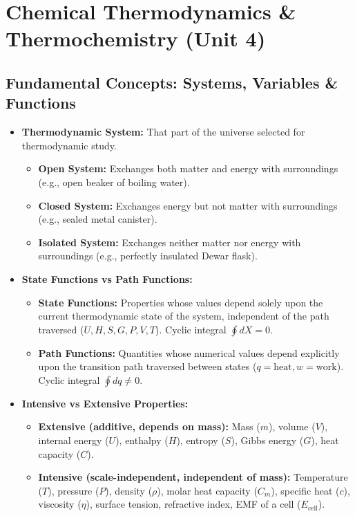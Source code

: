 \documentclass[10pt,a4paper]{article}
\begin{document}
\section{Chemical Thermodynamics \& Thermochemistry (Unit 4)}

\subsection{Fundamental Concepts: Systems, Variables \& Functions}
\begin{itemize}
  \item \textbf{Thermodynamic System:} That part of the universe selected for thermodynamic study.
  \begin{itemize}
    \item \textbf{Open System:} Exchanges both matter and energy with surroundings (e.g., open beaker of boiling water).
    \item \textbf{Closed System:} Exchanges energy but not matter with surroundings (e.g., sealed metal canister).
    \item \textbf{Isolated System:} Exchanges neither matter nor energy with surroundings (e.g., perfectly insulated Dewar flask).
  \end{itemize}
  \item \textbf{State Functions vs Path Functions:}
  \begin{itemize}
    \item \textbf{State Functions:} Properties whose values depend solely upon the current thermodynamic state of the system, independent of the path traversed ($U, H, S, G, P, V, T$). Cyclic integral $\oint dX = 0$.
    \item \textbf{Path Functions:} Quantities whose numerical values depend explicitly upon the transition path traversed between states ($q = \text{heat}, w = \text{work}$). Cyclic integral $\oint dq \ne 0$.
  \end{itemize}
  \item \textbf{Intensive vs Extensive Properties:}
  \begin{itemize}
    \item \textbf{Extensive (additive, depends on mass):} Mass ($m$), volume ($V$), internal energy ($U$), enthalpy ($H$), entropy ($S$), Gibbs energy ($G$), heat capacity ($C$).
    \item \textbf{Intensive (scale-independent, independent of mass):} Temperature ($T$), pressure ($P$), density ($\rho$), molar heat capacity ($C_m$), specific heat ($c$), viscosity ($\eta$), surface tension, refractive index, EMF of a cell ($E_{\text{cell}}$).
  \end{itemize}
\end{itemize}
\end{document}
